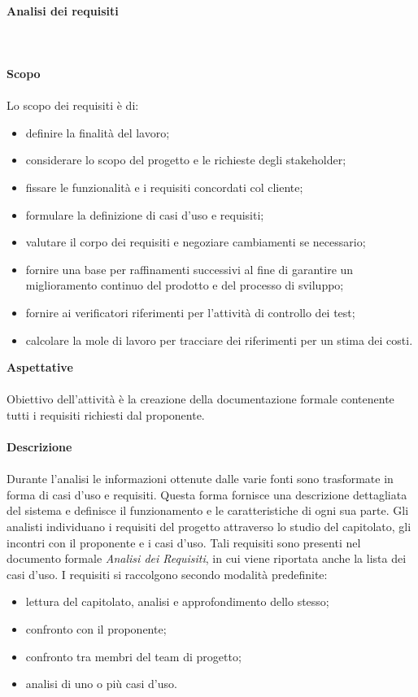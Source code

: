 		\paragraph{Analisi dei requisiti}
		\mbox{}\\ \mbox{}\\
			\textbf{Scopo}  \mbox{}\\ \mbox{}\\
			Lo scopo dei requisiti è di:
				\begin{itemize}
					\item definire la finalità del lavoro;
					\item considerare lo scopo del progetto e le richieste degli stakeholder;
					\item fissare le funzionalità e i requisiti concordati col cliente;
					\item formulare la definizione di casi d'uso e requisiti;
					\item valutare il corpo dei requisiti e negoziare cambiamenti se necessario;
					\item fornire  una  base  per  raffinamenti  successivi  al  fine  di garantire  un miglioramento continuo del prodotto e del processo di sviluppo;
					\item fornire ai verificatori riferimenti per l'attività di controllo dei test;
					\item calcolare la mole di lavoro per tracciare dei riferimenti per un stima dei costi.
				\end{itemize}
			\textbf{Aspettative} \mbox{}\\ \mbox{}\\
			\noindent Obiettivo dell'attività è la creazione della documentazione formale contenente tutti i requisiti richiesti dal proponente. \\ \\		
			\textbf{Descrizione} \mbox{}\\ \mbox{}\\
			Durante l'analisi le informazioni ottenute dalle varie fonti sono trasformate in forma di casi d'uso e requisiti. Questa forma fornisce una descrizione dettagliata del sistema e definisce il funzionamento e le caratteristiche di ogni sua parte.\newline
			Gli analisti individuano i requisiti del progetto attraverso lo studio del capitolato, gli incontri con il proponente e i casi d'uso. Tali requisiti sono 	presenti nel documento formale \textit{Analisi dei Requisiti}, in cui viene riportata 	anche la lista dei casi d'uso. \newline
			\noindent I requisiti si raccolgono secondo modalità predefinite:
			\begin{itemize}
				\item lettura del capitolato\glo, analisi e approfondimento dello stesso;
				\item confronto con il proponente;
				\item confronto tra membri del team di progetto;
				\item analisi di uno o più casi d'uso.  \\
			\end{itemize}
			
